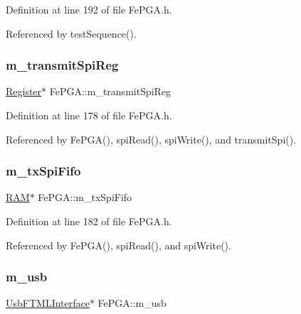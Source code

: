 Definition at line 192 of file Fe\+P\+G\+A.\+h.



Referenced by test\+Sequence().

\mbox{\label{classFePGA_a003ee241fb5f32fb3442174db3fe6f49}} 
\subsubsection{\texorpdfstring{m\+\_\+transmit\+Spi\+Reg}{m\_transmitSpiReg}}
{\footnotesize\ttfamily \hyperlink{classRegister}{Register}$\ast$ Fe\+P\+G\+A\+::m\+\_\+transmit\+Spi\+Reg\hspace{0.3cm}{\ttfamily [private]}}



Definition at line 178 of file Fe\+P\+G\+A.\+h.



Referenced by Fe\+P\+G\+A(), spi\+Read(), spi\+Write(), and transmit\+Spi().

\mbox{\label{classFePGA_a5b3e4deb73a882e6f044450d8a733558}} 
\subsubsection{\texorpdfstring{m\+\_\+tx\+Spi\+Fifo}{m\_txSpiFifo}}
{\footnotesize\ttfamily \hyperlink{classRAM}{R\+AM}$\ast$ Fe\+P\+G\+A\+::m\+\_\+tx\+Spi\+Fifo\hspace{0.3cm}{\ttfamily [private]}}



Definition at line 182 of file Fe\+P\+G\+A.\+h.



Referenced by Fe\+P\+G\+A(), spi\+Read(), and spi\+Write().

\mbox{\label{classFePGA_afb7947e600a66d914ee524acec3d8b1f}} 
\subsubsection{\texorpdfstring{m\+\_\+usb}{m\_usb}}
{\footnotesize\ttfamily \hyperlink{classUsbFTMLInterface}{Usb\+F\+T\+M\+L\+Interface}$\ast$ Fe\+P\+G\+A\+::m\+\_\+usb\hspace{0.3cm}{\ttfamily [private]}}



